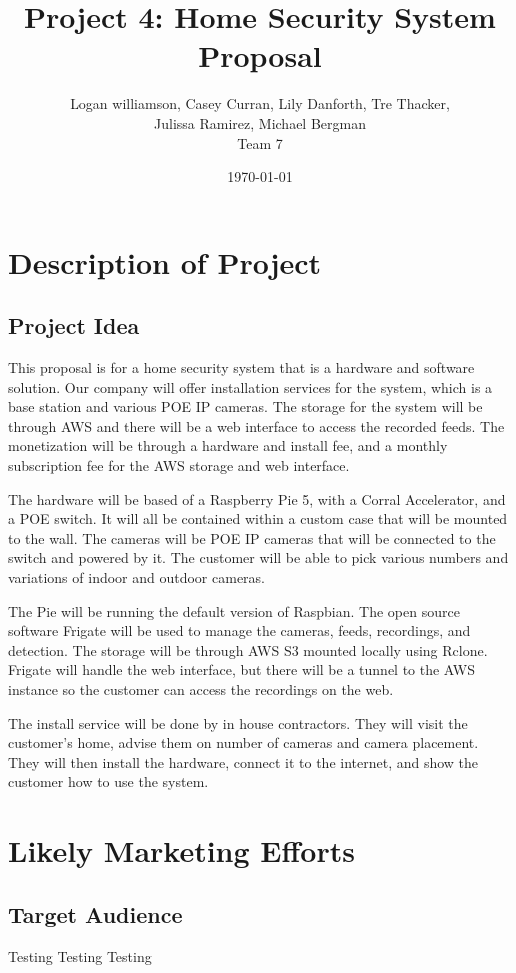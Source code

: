 \documentclass{report}
\title{Project 4: Home Security System Proposal}
\author{Logan williamson, Casey Curran, Lily Danforth, Tre Thacker, \\ Julissa Ramirez, Michael Bergman \\ Team 7}
\date{\today}
\begin{document}
\maketitle

\tableofcontents
\newpage

\chapter{Description of Project}
\section{Project Idea}
This proposal is for a home security system that is a hardware and software solution.
Our company will offer installation services for the system, which is a base station and various POE IP cameras.
The storage for the system will be through AWS and there will be a web interface to access the recorded feeds.
The monetization will be through a hardware and install fee, and a monthly subscription fee for the AWS storage and web interface.

The hardware will be based of a Raspberry Pie 5, with a Corral Accelerator, and a POE switch.
It will all be contained within a custom case that will be mounted to the wall.
The cameras will be POE IP cameras that will be connected to the switch and powered by it.
The customer will be able to pick various numbers and variations of indoor and outdoor cameras.

The Pie will be running the default version of Raspbian.
The open source software Frigate will be used to manage the cameras, feeds, recordings, and detection.
The storage will be through AWS S3 mounted locally using Rclone.
Frigate will handle the web interface, but there will be a tunnel to the AWS instance so the customer can access the recordings on the web.

The install service will be done by in house contractors.
They will visit the customer's home, advise them on number of cameras and camera placement.
They will then install the hardware, connect it to the internet, and show the customer how to use the system.


\chapter{Likely Marketing Efforts}
\section{Target Audience}
Testing Testing Testing
\end{document}
